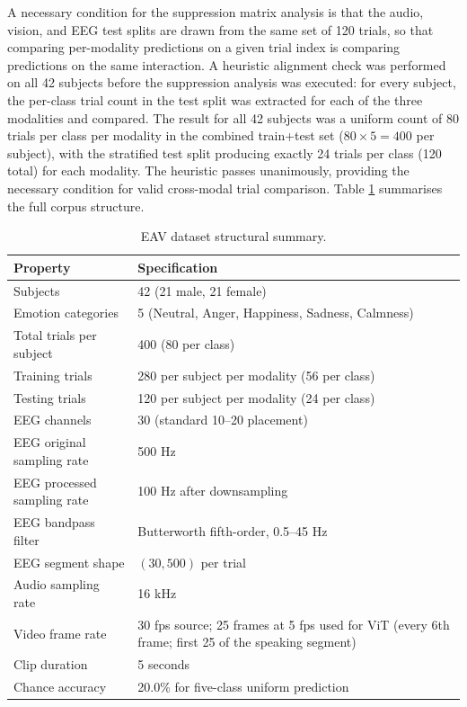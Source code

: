 A necessary condition for the suppression matrix analysis is that the audio, vision, and EEG test splits are drawn from the same set of 120 trials, so that comparing per-modality predictions on a given trial index is comparing predictions on the same interaction. A heuristic alignment check was performed on all 42 subjects before the suppression analysis was executed: for every subject, the per-class trial count in the test split was extracted for each of the three modalities and compared. The result for all 42 subjects was a uniform count of 80 trials per class per modality in the combined train+test set ($80\times5=400$ per subject), with the stratified test split producing exactly 24 trials per class (120 total) for each modality. The heuristic passes unanimously, providing the necessary condition for valid cross-modal trial comparison. Table \ref{tab:eav_dataset_structure} summarises the full corpus structure.

\begin{table}[htbp]
\centering
\small
\caption{EAV dataset structural summary.}
\label{tab:eav_dataset_structure}
\begin{tabular}{p{5.2cm} p{8.2cm}}
\hline
\textbf{Property} & \textbf{Specification} \\
\hline
Subjects & 42 (21 male, 21 female) \\
Emotion categories & 5 (Neutral, Anger, Happiness, Sadness, Calmness) \\
Total trials per subject & 400 (80 per class) \\
Training trials & 280 per subject per modality (56 per class) \\
Testing trials & 120 per subject per modality (24 per class) \\
EEG channels & 30 (standard 10--20 placement) \\
EEG original sampling rate & 500 Hz \\
EEG processed sampling rate & 100 Hz after downsampling \\
EEG bandpass filter & Butterworth fifth-order, 0.5--45 Hz \\
EEG segment shape & $(30, 500)$ per trial \\
Audio sampling rate & 16 kHz \\
Video frame rate & 30 fps source; 25 frames at 5 fps used for ViT (every 6th frame; first 25 of the speaking segment) \\
Clip duration & 5 seconds \\
Chance accuracy & 20.0\% for five-class uniform prediction \\
\hline
\end{tabular}
\end{table}


